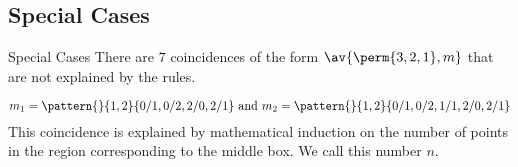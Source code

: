 \subsection{Special Cases}
\label{sub:Special Cases}
\begin{frame}{Special Cases}
  There are \(7\) coincidences of the form \(\av{\perm{3,2,1},m}\) that are not
  explained by the rules.
  \begin{example}
    \begin{equation*}
      m_1 = \pattern{}{1,2}{0/1,0/2,2/0,2/1} \text{ and } m_2 = \pattern{}{1,2}{0/1,0/2,1/1,2/0,2/1}
    \end{equation*}
    This coincidence is explained by mathematical induction on the number of
    points in the region corresponding to the middle box.
  We call this number \(n\).
  \end{example}
\end{frame}
